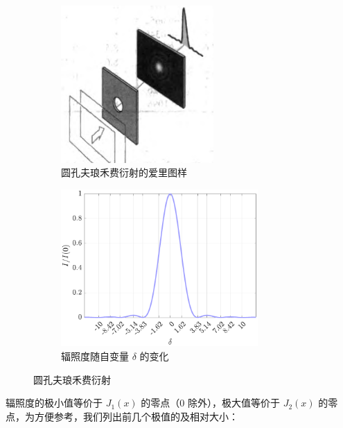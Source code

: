 \documentclass[UTF8]{report}
\theoremstyle{MyLineTheoremStyle} %
\theoremstyle{MyBlockTheoremStyle} %
\theoremstyle{MySubsubsectionStyle} %
\begin{document}
\begin{figure}[H]\centering
\begin{subfigure}[b]{0.5\columnwidth}\centering
    \includegraphics[height=170pt]{assets/4/4.3 圆孔衍射示意图.png}
    \caption{圆孔夫琅禾费衍射的爱里图样}
\end{subfigure}\hfill
\begin{subfigure}[b]{0.5\columnwidth}\centering
    \includegraphics[height=170pt]{assets/4/4.3 圆孔辐照度 3.pdf}
    \caption{辐照度随自变量 $\delta$ 的变化}
\end{subfigure}\vspace*{-3mm}
\caption{圆孔夫琅禾费衍射}
\end{figure}
辐照度的极小值等价于 $J_1(x)$ 的零点（0 除外），极大值等价于 $J_2(x)$ 的零点，为方便参考，我们列出前几个极值的及相对大小：
\end{document}
